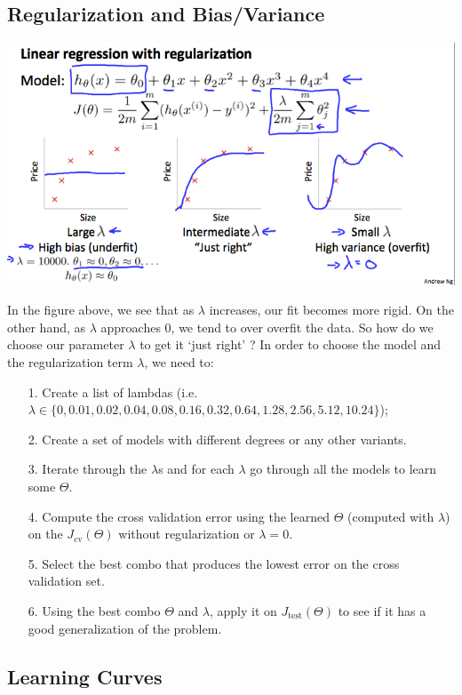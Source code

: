 \documentclass[UTF8]{article}
\begin{document}
\subsection{Regularization and Bias/Variance}

\includegraphics[width = \textwidth]{NotePics/10_4_1.png}

In the figure above, we see that as $\lambda$ increases, our fit becomes more rigid. On the other hand, as $\lambda$ approaches 0, we tend to over overfit the data. So how do we choose our parameter $\lambda$ to get it `just right' ? In order to choose the model and the regularization term $\lambda$, we need to:

\begin{itemize}
\item[{1.}]Create a list of lambdas (i.e. $\lambda\in\{0,0.01,0.02,0.04,0.08,0.16,0.32,0.64,1.28,2.56,5.12,10.24\}$);
\item[{2.}]Create a set of models with different degrees or any other variants.
\item[{3.}]Iterate through the $\lambda$s and for each $\lambda$ go through all the models to learn some $\Theta$.
\item[{4.}]Compute the cross validation error using the learned $\Theta$ (computed with $\lambda$) on the $J_\text{cv}(\Theta)$ without regularization or $\lambda = 0$.
\item[{5.}]Select the best combo that produces the lowest error on the cross validation set.
\item[{6.}]Using the best combo $\Theta$ and $\lambda$, apply it on $J_\text{test}(\Theta)$ to see if it has a good generalization of the problem.
\end{itemize}

\subsection{Learning Curves}
\end{document}
